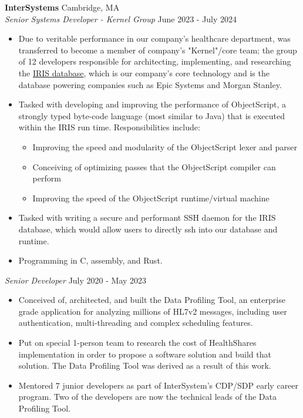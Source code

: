 \documentclass[a4paper]{article}
\begin{document}
\textbf{InterSystems} \hfill Cambridge, MA\\
\textit{Senior Systems Developer - Kernel Group} \hfill June 2023 - July 2024\\
\begin{itemize} \itemsep 1pt
	\item Due to veritable performance in our company's healthcare department, was transferred to become a member of company's "Kernel"/core team; the group of 12 developers responsible for architecting, implementing, and researching the \href{https://www.intersystems.com/data-platform/}{IRIS database}, which is our company's core technology and is the database powering companies such as Epic Systems and Morgan Stanley.
	\item Tasked with developing and improving the performance of ObjectScript, a strongly typed byte-code language (most similar to Java) that is executed within the IRIS run time. Responsibilities include:
	      \begin{itemize}
		      \item Improving the speed and modularity of the ObjectScript lexer and parser
		      \item Conceiving of optimizing passes that the ObjectScript compiler can perform
		      \item Improving the speed of the ObjectScript runtime/virtual machine
	      \end{itemize}
	\item Tasked with writing a secure and performant SSH daemon for the IRIS database, which would allow users to directly ssh into our database and runtime.
	\item Programming in C, assembly, and Rust.
\end{itemize}
\textit{Senior Developer} \hfill July 2020 - May 2023\\
\vspace{-1mm}
\begin{itemize} \itemsep 1pt
	\item Conceived of, architected, and built the Data Profiling Tool,
	      an enterprise grade application for analyzing millions of HL7v2 messages, including user authentication, multi-threading and complex scheduling features.
	\item Put on special 1-person team to research the cost of HealthShare\textquotesingle{}s
	      implementation in order to propose a software solution and build that solution.
	      The Data Profiling Tool was derived as a result of this work.
	\item Mentored 7 junior developers as part of InterSystem's CDP/SDP early career program. Two of the developers are now the technical leads of the Data Profiling Tool.
\end{itemize}
\end{document}
